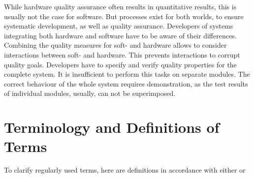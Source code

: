 While hardware quality assurance often results in quantitative results, this is usually not the case for software. But processes exist for both worlds, to ensure systematic development, as well as quality assurance. Developers of systems integrating both hardware and software have to be aware of their differences. Combining the quality measures for soft- and hardware allows to consider interactions between soft- and hardware. This prevents interactions to corrupt quality goals. Developers have to specify and verify quality properties for the complete system. It is insufficient to perform this tasks on separate modules. The correct behaviour of the whole system requires demonstration, as the test results of individual modules, usually, can not be superimposed.
	
	
	\section{Terminology and Definitions of Terms}
	To clarify regularly used terms, here are definitions in accordance with either \cite{Kopetz1997} or \cite{Liggesmeyer2002}
